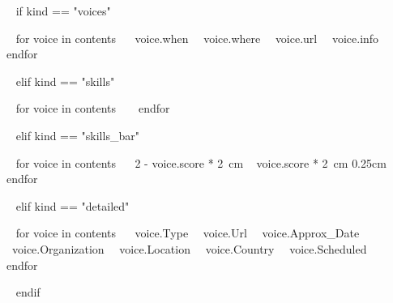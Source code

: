 ~{ if kind == "voices" }~


    ~{ for voice in contents }~
        {~{{voice.when}}~}
        {~{{voice.where}}~}
        {~{{voice.url}}~}       
        {~{{voice.info}}~}~{ endfor }~

~{ elif kind == "skills" }~

    
    ~{ for voice in contents }~
    ~{ endfor }~
        

~{ elif kind == "skills_bar" }~

    
    ~{ for voice in contents }~
    {~{{2 - voice.score * 2}}~cm}
    {~{{    voice.score * 2}}~cm}
    {0.25cm}~{ endfor }~

~{ elif kind == "detailed" }~


    ~{ for voice in contents }~
        {~{{voice.Type}}~}
        {~{{voice.Url}}~}
        {~{{voice.Approx_Date}}~}
        {~{{voice.Organization}}~}
        {~{{voice.Location}}~}
        {~{{voice.Country}}~}
        {~{{voice.Scheduled}}~}
    ~{ endfor }~


~{ endif }~


